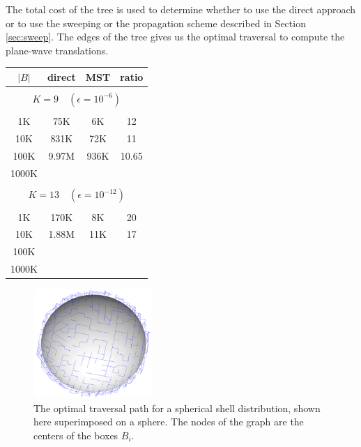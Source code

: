 The total cost of the tree is used to determine whether to use the direct approach or to use the sweeping or the propagation scheme described in Section \ref{sec:sweep}. The edges of the tree gives us the optimal traversal to compute the plane-wave translations.
\begin{table}
\centering
\begin{tabular}{cccc} \hline
        $|B|$  &  direct & MST & ratio \\ \hline       
        \multicolumn{4}{c}{}  \\
        \multicolumn{4}{c}{ {\small $K =  9 \quad (\epsilon = 10^{-6})$}}  \\
        \multicolumn{4}{c}{}  \\
         1K & 75K & 6K & 12 \\  
        10K & 831K & 72K & 11 \\  
       100K & 9.97M & 936K & 10.65 \\  
       1000K & & &  \\  
       \multicolumn{4}{c}{}  \\
       \multicolumn{4}{c}{ {\small $K =  13 \quad (\epsilon = 10^{-12})$}}  \\
       \multicolumn{4}{c}{}  \\
             1K & 170K & 8K & 20 \\  
        10K & 1.88M & 11K & 17 \\  
        100K & & &  \\  
       1000K & & &  \\  
\hline
\end{tabular}
\end{table}


\begin{figure}
\centering 	
\includegraphics[width=0.4\textwidth]{figs/sphere_mst}
\caption{The optimal traversal path for a spherical shell distribution, shown here superimposed on a sphere. The nodes of the graph are the centers of the boxes $B_i$.}
\end{figure}

